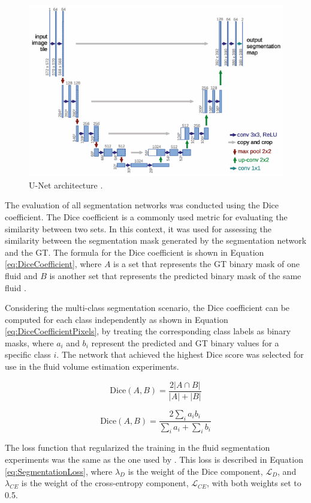 \begin{figure}[!ht]
	\centering
	\includegraphics[width=0.75\linewidth]{figures/UNet}
	\caption{U-Net architecture \parencite{Ronneberger2015}.}
	\label{fig:UNet}
\end{figure}

The evaluation of all segmentation networks was conducted using the Dice coefficient. The Dice coefficient is a commonly used metric for evaluating the similarity between two sets. In this context, it was used for assessing the similarity between the segmentation mask generated by the segmentation network and the GT. The formula for the Dice coefficient is shown in Equation \ref{eq:DiceCoefficient}, where $A$ is a set that represents the GT binary mask of one fluid and $B$ is another set that represents the predicted binary mask of the same fluid \parencite{Shamir2019}. 
\par
Considering the multi-class segmentation scenario, the Dice coefficient can be computed for each class independently as shown in Equation \ref{eq:DiceCoefficientPixels}, by treating the corresponding class labels as binary masks, where $a_{i}$ and $b_{i}$ represent the predicted and GT binary values for a specific class $i$. The network that achieved the highest Dice score was selected for use in the fluid volume estimation experiments.

\begin{equation}
	\text{Dice}(A, B) = \frac{2|A \cap B|}{|A| + |B|}
	\label{eq:DiceCoefficient}
\end{equation}

\begin{equation}
	\text{Dice}(A, B) = \frac{2\sum_{i} a_{i} b_{i}}{\sum_{i} a_{i} + \sum_{i} b_{i}}
	\label{eq:DiceCoefficientPixels}
\end{equation}

The loss function that regularized the training in the fluid segmentation experiments was the same as the one used by \textcite{Tennakoon2018}. This loss is described in Equation \ref{eq:SegmentationLoss}, where $\lambda_{D}$ is the weight of the Dice component, $\mathcal{L}_{D}$, and $\lambda_{CE}$ is the weight of the cross-entropy component, $\mathcal{L}_{CE}$, with both weights set to 0.5.

